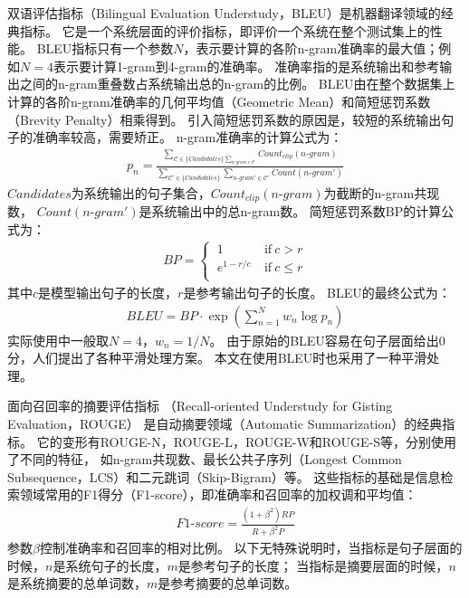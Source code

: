 双语评估指标（Bilingual Evaluation Understudy，BLEU）是机器翻译领域的经典指标。
它是一个系统层面的评价指标，即评价一个系统在整个测试集上的性能。
BLEU指标只有一个参数$N$，表示要计算的各阶n-gram准确率的最大值；例如$N = 4$表示要计算1-gram到4-gram的准确率。
准确率指的是系统输出和参考输出之间的n-gram重叠数占系统输出总的n-gram的比例。
BLEU由在整个数据集上计算的各阶n-gram准确率的几何平均值（Geometric Mean）和简短惩罚系数（Brevity Penalty）相乘得到。
引入简短惩罚系数的原因是，较短的系统输出句子的准确率较高，需要矫正。
n-gram准确率的计算公式为：
\begin{align}
    p_n = \frac{
    \sum_{\mathcal{C} \in \{\textit{Candidates}\}
    \sum_{\textit{n-gram} \in \mathcal{C}}}
    \textit{Count}_{\textit{clip}}(\textit{n-gram})
    }{
    \sum_{\mathcal{C'} \in \{\textit{Candidates}\}}
    \sum_{\textit{n-gram}' \in \mathcal{C'}}
    \textit{Count}(\textit{n-gram}')
    }
\end{align}
$\textit{Candidates}$为系统输出的句子集合，$\textit{Count}_{\textit{clip}}(\textit{n-gram})$为截断的n-gram共现数，
$\textit{Count}(\textit{n-gram}')$是系统输出中的总n-gram数。
简短惩罚系数BP的计算公式为：
\begin{align}
    \textit{BP} =
    \begin{cases}
        \ 1 \ & \text{if} \  c > r \\
        \ e^{1 - r/c} \ & \text{if} \  c \leq r \\
    \end{cases}
\end{align}
其中$c$是模型输出句子的长度，$r$是参考输出句子的长度。
BLEU的最终公式为：
\begin{align}
    \textit{BLEU} = \textit{BP} \cdot \exp \left( \sum_{n=1}^N w_n \log p_n \right)
\end{align}
实际使用中一般取$N = 4$，$w_n = 1 / N$。
由于原始的BLEU容易在句子层面给出0分，人们提出了各种平滑处理方案。
本文在使用BLEU时也采用了一种平滑处理。

面向召回率的摘要评估指标
（Recall-oriented Understudy for Gisting Evaluation，ROUGE）
是自动摘要领域（Automatic Summarization）的经典指标。
它的变形有ROUGE-N，ROUGE-L，ROUGE-W和ROUGE-S等，分别使用了不同的特征，
如n-gram共现数、最长公共子序列（Longest Common Subsequence，LCS）和二元跳词（Skip-Bigram）等。
这些指标的基础是信息检索领域常用的F1得分（F1-score），即准确率和召回率的加权调和平均值：
\begin{align}
    \textit{F1-score} = \frac{(1 + \beta^2) RP}{R + \beta^2 P}
\end{align}
参数$\beta$控制准确率和召回率的相对比例。
以下无特殊说明时，当指标是句子层面的时候，$n$是系统句子的长度，$m$是参考句子的长度；
当指标是摘要层面的时候，$n$是系统摘要的总单词数，$m$是参考摘要的总单词数。

